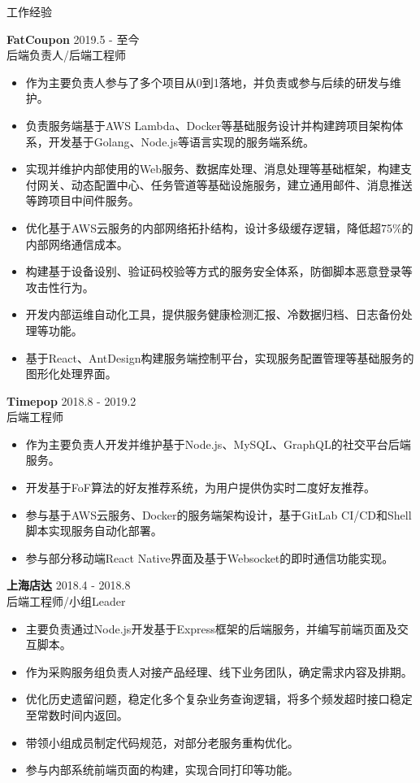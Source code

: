 \documentclass{resume} %
\begin{document}
\begin{rSection}{工作经验}

\textbf{FatCoupon} \hfill 2019.5 - 至今\\
后端负责人/后端工程师 \hfill \textit{}
\begin{itemize}
  \itemsep -3pt {}
  \item 作为主要负责人参与了多个项目从0到1落地，并负责或参与后续的研发与维护。
  \item 负责服务端基于AWS Lambda、Docker等基础服务设计并构建跨项目架构体系，开发基于Golang、Node.js等语言实现的服务端系统。
  \item 实现并维护内部使用的Web服务、数据库处理、消息处理等基础框架，构建支付网关、动态配置中心、任务管道等基础设施服务，建立通用邮件、消息推送等跨项目中间件服务。
  \item 优化基于AWS云服务的内部网络拓扑结构，设计多级缓存逻辑，降低超75\%的内部网络通信成本。
  \item 构建基于设备设别、验证码校验等方式的服务安全体系，防御脚本恶意登录等攻击性行为。
  \item 开发内部运维自动化工具，提供服务健康检测汇报、冷数据归档、日志备份处理等功能。
  \item 基于React、AntDesign构建服务端控制平台，实现服务配置管理等基础服务的图形化处理界面。
\end{itemize}

\textbf{Timepop} \hfill 2018.8 - 2019.2\\
后端工程师 \hfill \textit{}
\begin{itemize}
  \itemsep -3pt {}
  \item 作为主要负责人开发并维护基于Node.js、MySQL、GraphQL的社交平台后端服务。
  \item 开发基于FoF算法的好友推荐系统，为用户提供伪实时二度好友推荐。
  \item 参与基于AWS云服务、Docker的服务端架构设计，基于GitLab CI/CD和Shell脚本实现服务自动化部署。
  \item 参与部分移动端React Native界面及基于Websocket的即时通信功能实现。
\end{itemize}

\textbf{上海店达} \hfill 2018.4 - 2018.8\\
后端工程师/小组Leader \hfill \textit{}
\begin{itemize}
  \itemsep -3pt {}
  \item 主要负责通过Node.js开发基于Express框架的后端服务，并编写前端页面及交互脚本。
  \item 作为采购服务组负责人对接产品经理、线下业务团队，确定需求内容及排期。
  \item 优化历史遗留问题，稳定化多个复杂业务查询逻辑，将多个频发超时接口稳定至常数时间内返回。
  \item 带领小组成员制定代码规范，对部分老服务重构优化。
  \item 参与内部系统前端页面的构建，实现合同打印等功能。
\end{itemize}


\end{rSection}
\end{document}
